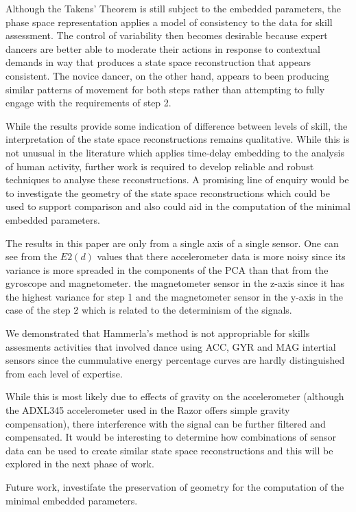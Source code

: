 \documentclass{sigchi}
\begin{document}
Although the Takens' Theorem is still subject to the embedded parameters, 
the phase space representation applies a model of consistency to the data for skill assessment. 
The control of variability then becomes desirable because expert dancers are better able to moderate 
their actions in response to contextual demands in way that produces a state space reconstruction 
that appears consistent.  The novice dancer, on the other hand, appears to been producing similar 
patterns of movement for both steps rather than attempting to fully engage with the requirements of step 2.  

While the results provide some indication of difference between levels of skill, the interpretation of 
the state space reconstructions remains qualitative.  While this is not unusual in the literature
which applies time-delay embedding to the analysis of human activity, further work is required to develop 
reliable and robust techniques to analyse these reconstructions.  
A promising line of enquiry would be to investigate the geometry of the state space reconstructions
which could be used to support comparison \cite{Sama2013} and also could aid in the computation of the minimal 
embedded parameters. 
 
The results in this paper are only from a single axis of a single sensor. 
One can see from the $E2(d)$ values that there accelerometer data is more noisy since its variance is 
more spreaded in the components of the PCA than that from the gyroscope and magnetometer.  
the magnetometer sensor in the z-axis since it has the highest
variance for step 1 and the magnetometer sensor in the y-axis
in the case of the step 2 which is related to the determinism of the signals.

We demonstrated that Hammerla's method is not appropriable for skills assesments activities that involved dance
using ACC, GYR and MAG intertial sensors since the cummulative energy percentage curves are hardly distinguished
from each level of expertise.

While this is most likely due to effects of gravity on the accelerometer 
(although the ADXL345 accelerometer used in the Razor offers simple gravity compensation), 
there interference with the signal can be further filtered and compensated.  
It would be interesting to determine how combinations of sensor data can be used to create similar 
state space reconstructions and this will be explored in the next phase of work. 

Future work, investifate the preservation of geometry \cite{Yap2014} 
for the computation of the minimal embedded parameters.
\end{document}

